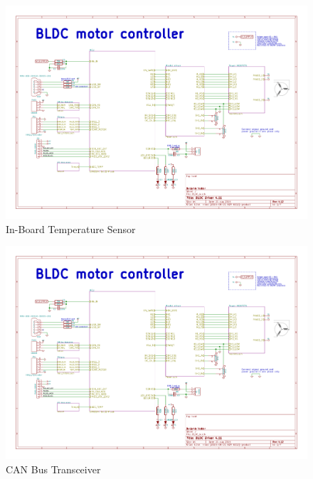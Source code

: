 \begin{figure}
    \includegraphics[width=\textwidth,page=3]{Images/BLDC_4}
    \caption{In-Board Temperature Sensor}
    \label{fig:sch3}
\end{figure}

\begin{figure}
    \includegraphics[width=\textwidth,page=4]{Images/BLDC_4}
    \caption{CAN Bus Transceiver}
    \label{fig:sch4}
\end{figure}

